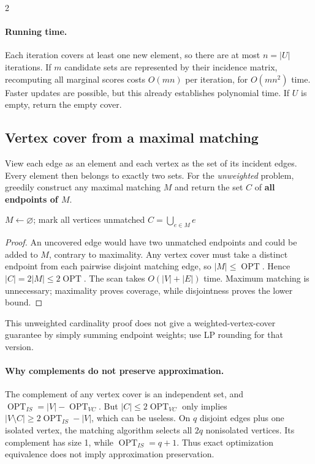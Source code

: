 \documentclass[8pt]{extarticle}
\theoremstyle{definition}
\newcommand{\OPT}{\operatorname{OPT}}
\begin{document}
\begin{multicols*}{2}
\paragraph{Running time.}
Each iteration covers at least one new element, so there are at most $n=|U|$ iterations.
If $m$ candidate sets are represented by their incidence matrix, recomputing all marginal
scores costs $O(mn)$ per iteration, for $O(mn^2)$ time. Faster updates are possible, but this
already establishes polynomial time. If $U$ is empty, return the empty cover.


\subsection{Vertex cover from a maximal matching}
\label{gre:vc}
View each edge as an element and each vertex as the set of its incident edges. Every
element then belongs to exactly two sets. For the \emph{unweighted} problem, greedily
construct any maximal matching $M$ and return the set $C$ of \textbf{all endpoints of $M$}.

\begin{algorithm}[H]
\caption{Maximal-matching vertex cover}
$M\gets\varnothing$; mark all vertices unmatched\;
\Return $C=\bigcup_{e\in M}e$\;
\end{algorithm}
\begin{proof}
An uncovered edge would have two unmatched endpoints and could be added to $M$, contrary
to maximality. Any vertex cover must take a distinct endpoint from each pairwise disjoint
matching edge, so $|M|\le\OPT$. Hence $|C|=2|M|\le2\OPT$.
The scan takes $O(|V|+|E|)$ time. Maximum matching is unnecessary; maximality proves
coverage, while disjointness proves the lower bound.
\end{proof}
This unweighted cardinality proof does not give a weighted-vertex-cover guarantee by
simply summing endpoint weights; use LP rounding for that version.

\paragraph{Why complements do not preserve approximation.}
The complement of any vertex cover is an independent set, and $\OPT_{IS}=|V|-\OPT_{VC}$.
But $|C|\le2\OPT_{VC}$ only implies
$|V\setminus C|\ge2\OPT_{IS}-|V|$, which can be useless. On $q$ disjoint edges plus one
isolated vertex, the matching algorithm selects all $2q$ nonisolated vertices. Its complement
has size 1, while $\OPT_{IS}=q+1$. Thus exact optimization equivalence does not imply
approximation preservation.


\end{multicols*}
\end{document}
